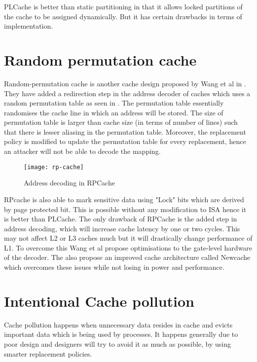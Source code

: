 PLCache is better than static partitioning in that it allows locked partitions
of the cache to be assigned dynamically.
But it has certain drawbacks in terms of implementation.

\section{Random permutation cache}

Random-permutation cache is another cache design proposed by Wang et al in
.
They have added a redirection step in the address decoder of caches which uses
a random permutation table as seen in .
The permutation table essentially randomises the cache line in which an
address will be stored.
The size of permutation table is larger than cache size (in terms of number of
lines) such that there is lesser aliasing in the permutation table. Moreover,
the replacement policy is modified to update the permutation table for every
replacement, hence an attacker will not be able to decode the mapping.

\begin{figure}
    \centering
    \texttt{[image: rp-cache]}
    \caption{Address decoding in RPCache}
    \label{fig:rpcache}
\end{figure}

RPcache is also able to mark sensitive data using "Lock" bits which are
derived by page protected bit.
This is possible without any modification to ISA hence it is better than PLCache.
The only drawback of RPCache is the added step in address decoding, which will
increase cache latency by one or two cycles.
This may not affect L2 or L3 caches much but it will drastically change
performance of L1.
To overcome this Wang et al propose optimisations to the gate-level hardware
of the decoder.
The also propose an improved cache architecture called Newcache
 which overcomes these issues while not losing in power and
performance.

\section{Intentional Cache pollution}

Cache pollution happens when unnecessary data resides in cache and evicts
important data which is being used by processes.
It happens generally due to poor design and designers will
try to avoid it as much as possible, by using smarter replacement policies.


